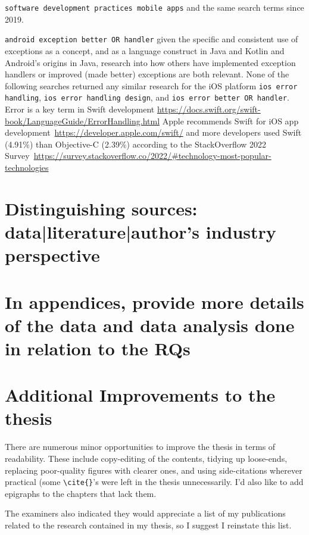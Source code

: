 
\verb|software development practices mobile apps| and the same search terms since 2019.

\verb|android exception better OR handler| given the specific and consistent use of exceptions as a concept, and as a language construct in Java and Kotlin and Android's origins in Java, research into how others have implemented exception handlers or improved (made better) exceptions are both relevant. None of the following searches returned any similar research for the iOS platform \verb|ios error handling|, \verb|ios error handling design|, and \verb|ios error better OR handler|. Error is a key term in Swift development \url{https://docs.swift.org/swift-book/LanguageGuide/ErrorHandling.html} Apple recommends Swift for iOS app development~\url{https://developer.apple.com/swift/} and more developers used Swift (4.91\%) than Objective-C (2.39\%) according to the StackOverflow 2022 Survey~\url{https://survey.stackoverflow.co/2022/\#technology-most-popular-technologies} 




\section{Distinguishing sources: data|literature|author's industry perspective}


\section{In appendices, provide more details of the data and data analysis done in relation to the RQs}


\section{Additional Improvements to the thesis}
There are numerous minor opportunities to improve the thesis in terms of readability. These include copy-editing of the contents, tidying up loose-ends, replacing poor-quality figures with clearer ones, and using side-citations wherever practical (some \verb+\cite{}+'s were left in the thesis unnecessarily. I'd also like to add epigraphs to the chapters that lack them.

The examiners also indicated they would appreciate a list of my publications related to the research contained in my thesis,  so I suggest I reinstate this list.
